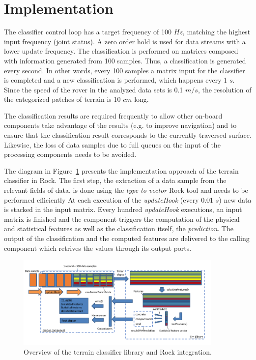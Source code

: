 
\section{Implementation}

The classifier control loop has a target frequency of 100 $Hz$, matching the highest input frequency (joint status). 
A zero order hold is used for data streams with a lower update frequency. 
The classification is performed on matrices composed with information generated from 100 samples. 
Thus, a classification is generated every second.
In other words, every 100 samples a matrix input for the classifier is completed and a new classification is performed, which happens every 1 $s$.
Since the speed of the rover in the analyzed data sets is 0.1 $m/s$, the resolution of the categorized patches of terrain is 10 $cm$ long.  

The classification results are required frequently to allow other on-board components take advantage of the results (e.g. to improve navigation) and to ensure that the classification result corresponds to the currently traversed surface. 
Likewise, the loss of data samples due to full queues on the input of the processing components needs to be avoided. 

The diagram in Figure~\ref{fig:overview} presents the implementation approach of the terrain classifier in Rock. 
The first step, the extraction of a data sample from the relevant fields of data, is done using the \emph{type to vector} Rock tool and needs to be performed efficiently 
At each execution of the \emph{updateHook} (every 0.01 $s$) new data is stacked in the input matrix.
Every hundred \emph{updateHook} executions, an input matrix is finished and the component triggers the computation of the physical and statistical features as well as the classification itself, the \emph{prediction}.
The output of the classification and the computed features are delivered to the calling component which retrives the values through its output ports. 

\begin{figure}[!htbp]
    \centering
    \includegraphics[width=0.9\textwidth]{../figures/OverviewTC2.pdf}
    \caption{\label{fig:overview}Overview of the terrain classifier library and Rock integration.}
\end{figure}


